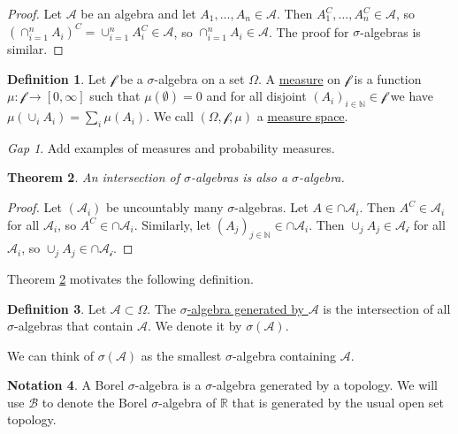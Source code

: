 \documentclass[11pt]{article}
\newcommand{\col}[1]{\mathscr{#1}}
\newcommand{\bor}{\col{B}}
\newcommand{\defname}[1]{\underline{#1}}
\newcommand{\NN}{\mathbb{N}}
\newcommand{\RR}{\mathbb{R}}
\theoremstyle{theorem}
\newtheorem{theorem}{Theorem}[section]
\theoremstyle{definition}
\newtheorem{definition}[theorem]{Definition}
\newtheorem{notation}[theorem]{Notation}
\theoremstyle{remark}
\theoremstyle{step}
\theoremstyle{gap}
\newtheorem*{gap}{Gap}
\begin{document}
\begin{proof}
Let \(\col{A}\) be an algebra and let \(A_1, \ldots, A_n \in \col{A}\). Then \(A_1^C, \ldots, A_n^C \in \col{A}\), so \(\left(\cap_{i=1}^n A_i\right)^C = \cup_{i=1}^n A_i^C \in \col{A}\), so \(\cap_{i=1}^n A_i \in \col{A}\). The proof for \(\sigma\)-algebras is similar.
\end{proof}

\begin{definition}
Let \(\col{f}\) be a \(\sigma\)-algebra on a set \(\Omega\). A \defname{measure} on \(\col{f}\) is a function \(\mu:\col{f} \to [0, \infty]\) such that \(\mu(\emptyset) = 0\) and for all disjoint \(\left(A_i\right)_{i\in \NN} \in \col{f}\) we have \(\mu\left(\cup_i A_i\right) = \sum_i \mu\left(A_i\right)\). We call \((\Omega, \col{f}, \mu)\) a \defname{measure space}.
\end{definition}

\begin{gap}
Add examples of measures and probability measures.
\end{gap}

\begin{theorem}\label{thm.intersection-algebras}
An intersection of \(\sigma\)-algebras is also a \(\sigma\)-algebra.
\end{theorem}

\begin{proof}
Let \((\col{A}_i)\) be uncountably many \(\sigma\)-algebras. Let \(A \in \cap \col{A}_i\). Then \(A^C \in \col{A}_i\) for all \(\col{A}_i\), so \(A^C \in \cap \col{A}_i\). Similarly, let \((A_j)_{j \in \NN} \in \cap \col{A}_i\). Then \(\cup_j A_j \in \col{A_i}\) for all \(\col{A}_i\), so \(\cup_j A_j \in \cap \col{A_i}\).
\end{proof}

Theorem \ref{thm.intersection-algebras} motivates the following definition.

\begin{definition}
Let \(\col{A} \subset \Omega\). The \defname{\(\sigma\)-algebra generated by \(\col{A}\)} is the intersection of all \(\sigma\)-algebras that contain \(\col{A}\). We denote it by \(\sigma(\col{A})\).
\end{definition}

We can think of \(\sigma(\col{A})\) as the smallest \(\sigma\)-algebra containing \(\col{A}\).

\begin{notation}
A Borel \(\sigma\)-algebra is a \(\sigma\)-algebra generated by a topology. We will use \(\bor\) to denote the Borel \(\sigma\)-algebra of \(\RR\) that is generated by the usual open set topology.
\end{notation}
\end{document}
